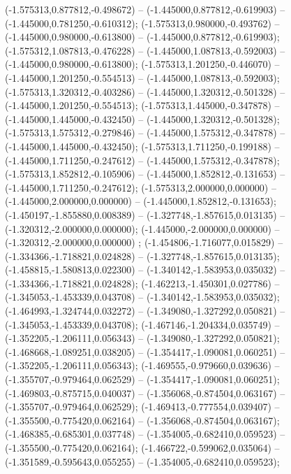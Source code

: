  (-1.575313,0.877812,-0.498672) -- (-1.445000,0.877812,-0.619903) -- (-1.445000,0.781250,-0.610312);
 (-1.575313,0.980000,-0.493762) -- (-1.445000,0.980000,-0.613800) -- (-1.445000,0.877812,-0.619903);
 (-1.575312,1.087813,-0.476228) -- (-1.445000,1.087813,-0.592003) -- (-1.445000,0.980000,-0.613800);
 (-1.575313,1.201250,-0.446070) -- (-1.445000,1.201250,-0.554513) -- (-1.445000,1.087813,-0.592003);
 (-1.575313,1.320312,-0.403286) -- (-1.445000,1.320312,-0.501328) -- (-1.445000,1.201250,-0.554513);
 (-1.575313,1.445000,-0.347878) -- (-1.445000,1.445000,-0.432450) -- (-1.445000,1.320312,-0.501328);
 (-1.575313,1.575312,-0.279846) -- (-1.445000,1.575312,-0.347878) -- (-1.445000,1.445000,-0.432450);
 (-1.575313,1.711250,-0.199188) -- (-1.445000,1.711250,-0.247612) -- (-1.445000,1.575312,-0.347878);
 (-1.575313,1.852812,-0.105906) -- (-1.445000,1.852812,-0.131653) -- (-1.445000,1.711250,-0.247612);
 (-1.575313,2.000000,0.000000) -- (-1.445000,2.000000,0.000000) -- (-1.445000,1.852812,-0.131653);
 (-1.450197,-1.855880,0.008389) -- (-1.327748,-1.857615,0.013135) -- (-1.320312,-2.000000,0.000000);
 (-1.445000,-2.000000,0.000000) -- (-1.320312,-2.000000,0.000000) ;
 (-1.454806,-1.716077,0.015829) -- (-1.334366,-1.718821,0.024828) -- (-1.327748,-1.857615,0.013135);
 (-1.458815,-1.580813,0.022300) -- (-1.340142,-1.583953,0.035032) -- (-1.334366,-1.718821,0.024828);
 (-1.462213,-1.450301,0.027786) -- (-1.345053,-1.453339,0.043708) -- (-1.340142,-1.583953,0.035032);
 (-1.464993,-1.324744,0.032272) -- (-1.349080,-1.327292,0.050821) -- (-1.345053,-1.453339,0.043708);
 (-1.467146,-1.204334,0.035749) -- (-1.352205,-1.206111,0.056343) -- (-1.349080,-1.327292,0.050821);
 (-1.468668,-1.089251,0.038205) -- (-1.354417,-1.090081,0.060251) -- (-1.352205,-1.206111,0.056343);
 (-1.469555,-0.979660,0.039636) -- (-1.355707,-0.979464,0.062529) -- (-1.354417,-1.090081,0.060251);
 (-1.469803,-0.875715,0.040037) -- (-1.356068,-0.874504,0.063167) -- (-1.355707,-0.979464,0.062529);
 (-1.469413,-0.777554,0.039407) -- (-1.355500,-0.775420,0.062164) -- (-1.356068,-0.874504,0.063167);
 (-1.468385,-0.685301,0.037748) -- (-1.354005,-0.682410,0.059523) -- (-1.355500,-0.775420,0.062164);
 (-1.466722,-0.599062,0.035064) -- (-1.351589,-0.595643,0.055255) -- (-1.354005,-0.682410,0.059523);
